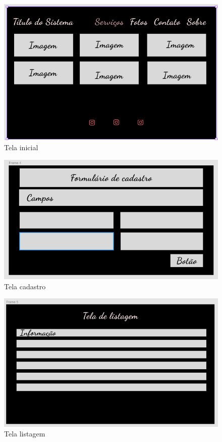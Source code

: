 \begin{figure}[H]
	\centering
	\includegraphics[width=1\linewidth]{prototipos/tela1}
	\caption[Tela inicial]{Tela inicial}
	\label{fig:fig5}
\end{figure}
\begin{figure}[H]
	\centering
	\includegraphics[width=1\linewidth]{prototipos/tela2}
	\caption[Tela cadastro]{Tela cadastro}
	\label{fig:fig6}
\end{figure}
\begin{figure}[H]
	\centering
	\includegraphics[width=1\linewidth]{prototipos/tela3}
	\caption[Tela listagem]{Tela listagem}
	\label{fig:fig7}
\end{figure}
